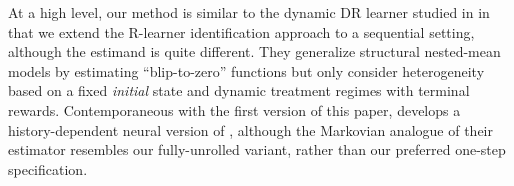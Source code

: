 \documentclass[opre,nonblindrev]{informs4}
\newcommand{\xmark}{\ding{55}}
\begin{document}
At a high level, our method is similar to the dynamic DR learner studied in \citep{lewis2021double} in that we extend the R-learner identification approach to a sequential setting, although the estimand is quite different. They generalize structural nested-mean models by estimating ``blip-to-zero'' functions but only consider heterogeneity based on a fixed \textit{initial} state and dynamic treatment regimes with terminal rewards. Contemporaneous with the first version of this paper, \citet{ma2025deepblip} develops a history-dependent neural version of \citet{lewis2021double}, although the Markovian analogue of their estimator resembles our fully-unrolled variant, rather than our preferred one-step specification.%
\end{document}
